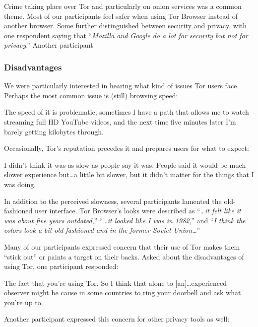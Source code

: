 Crime taking place over Tor and particularly on onion services was a common
theme.  Most of our participants feel safer when using Tor Browser instead of
another browser.  Some further distinguished between security and privacy, with
one respondent saying that ``\emph{Mozilla and Google do a lot for security but
    not for privacy}.''  Another participant 

\subsubsection{Disadvantages}

We were particularly interested in hearing what kind of issues Tor users face.
Perhaps the most common issue is (still) browsing speed:

\begin{displayquote}
The speed of it is problematic; sometimes I have a path that allows me to watch
streaming full HD YouTube videos, and the next time five minutes later I'm
barely getting kilobytes through.
\end{displayquote}

Occasionally, Tor's reputation precedes it and prepares users for what to
expect:

\begin{displayquote}
I didn't think it was as slow as people say it was. People said it would be much
slower experience but\ldots a little bit slower, but it didn't matter for the
things that I was doing.
\end{displayquote}

In addition to the perceived slowness, several participants lamented the
old-fashioned user interface.  Tor Browser's looks were described as
``\dots\emph{it felt like it was about five years outdated},'' ``\dots\emph{it
looked like I was in 1982},'' and ``\emph{I think the colors look a bit old
fashioned and in the former Soviet Union}\dots''

Many of our participants expressed concern that their use of Tor makes them
``stick out'' or paints a target on their backs.  Asked about the disadvantages
of using Tor, one participant responded:

\begin{displayquote}
The fact that you're using Tor.  So I think that alone to [an]\dots experienced
observer might be cause in some countries to ring your doorbell and ask what
you're up to.
\end{displayquote}

Another participant expressed this concern for other privacy tools as well:

